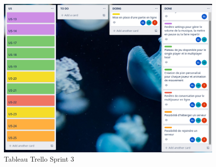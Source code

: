 \begin{figure}[ht]
	\centering
	\includegraphics[width=\textwidth]{trello_3.png}
	\caption{Tableau Trello Sprint 3}
	\label{Tableau Trello Sprint 3}
\end{figure}
